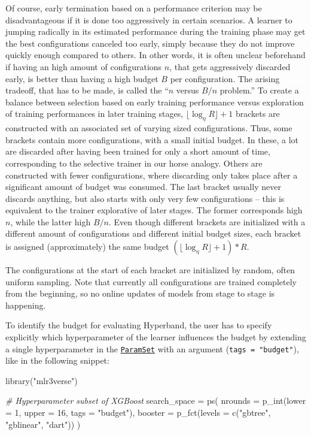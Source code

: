 \documentclass[
]{scrbook}
\newenvironment{Shaded}{\begin{snugshade}}{\end{snugshade}}
\newcommand{\AttributeTok}[1]{\textcolor[rgb]{0.77,0.63,0.00}{#1}}
\newcommand{\CommentTok}[1]{\textcolor[rgb]{0.56,0.35,0.01}{\textit{#1}}}
\newcommand{\DecValTok}[1]{\textcolor[rgb]{0.00,0.00,0.81}{#1}}
\newcommand{\FunctionTok}[1]{\textcolor[rgb]{0.00,0.00,0.00}{#1}}
\newcommand{\NormalTok}[1]{#1}
\newcommand{\OtherTok}[1]{\textcolor[rgb]{0.56,0.35,0.01}{#1}}
\newcommand{\StringTok}[1]{\textcolor[rgb]{0.31,0.60,0.02}{#1}}
\renewenvironment{Shaded} {\begin{snugshade}\small} {\end{snugshade}}
\begin{document}
Of course, early termination based on a performance criterion may be disadvantageous if it is done too aggressively in certain scenarios.
A learner to jumping radically in its estimated performance during the training phase may get the best configurations canceled too early, simply because they do not improve quickly enough compared to others.
In other words, it is often unclear beforehand if having an high amount of configurations \(n\), that gets aggressively discarded early, is better than having a high budget \(B\) per configuration.
The arising tradeoff, that has to be made, is called the ``\(n\) versus \(B/n\) problem.''
To create a balance between selection based on early training performance versus exploration of training performances in later training stages, \(\lfloor \log_{\eta}{R} \rfloor + 1\) brackets are constructed with an associated set of varying sized configurations.
Thus, some brackets contain more configurations, with a small initial budget.
In these, a lot are discarded after having been trained for only a short amount of time, corresponding to the selective trainer in our horse analogy.
Others are constructed with fewer configurations, where discarding only takes place after a significant amount of budget was consumed.
The last bracket usually never discards anything, but also starts with only very few configurations -- this is equivalent to the trainer explorative of later stages.
The former corresponds high \(n\), while the latter high \(B/n\).
Even though different brackets are initialized with a different amount of configurations and different initial budget sizes, each bracket is assigned (approximately) the same budget \((\lfloor \log_{\eta}{R} \rfloor + 1) * R\).

The configurations at the start of each bracket are initialized by random, often uniform sampling.
Note that currently all configurations are trained completely from the beginning, so no online updates of models from stage to stage is happening.

To identify the budget for evaluating Hyperband, the user has to specify explicitly which hyperparameter of the learner influences the budget by extending a single hyperparameter in the \href{https://paradox.mlr-org.com/reference/ParamSet.html}{\texttt{ParamSet}} with an argument (\texttt{tags\ =\ "budget"}), like in the following snippet:

\begin{Shaded}
\begin{Highlighting}[]
\FunctionTok{library}\NormalTok{(}\StringTok{"mlr3verse"}\NormalTok{)}

\CommentTok{\# Hyperparameter subset of XGBoost}
\NormalTok{search\_space }\OtherTok{=} \FunctionTok{ps}\NormalTok{(}
  \AttributeTok{nrounds =} \FunctionTok{p\_int}\NormalTok{(}\AttributeTok{lower =} \DecValTok{1}\NormalTok{, }\AttributeTok{upper =} \DecValTok{16}\NormalTok{, }\AttributeTok{tags =} \StringTok{"budget"}\NormalTok{),}
  \AttributeTok{booster =} \FunctionTok{p\_fct}\NormalTok{(}\AttributeTok{levels =} \FunctionTok{c}\NormalTok{(}\StringTok{"gbtree"}\NormalTok{, }\StringTok{"gblinear"}\NormalTok{, }\StringTok{"dart"}\NormalTok{))}
\NormalTok{)}
\end{Highlighting}
\end{Shaded}
\end{document}
